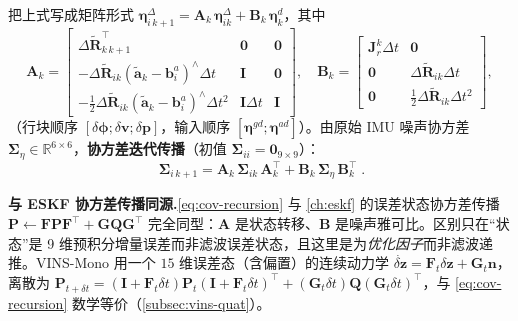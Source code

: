 把上式写成矩阵形式 $\boldsymbol\eta_{i\,k+1}^\Delta=\mathbf A_k\,\boldsymbol\eta_{ik}^\Delta+\mathbf B_k\,\boldsymbol\eta_k^d$，其中
\begin{equation}
  \mathbf A_k=\begin{bmatrix}
    \Delta\tilde{\mathbf R}_{k\,k+1}^\top & \mathbf 0 & \mathbf 0\\
    -\Delta\tilde{\mathbf R}_{ik}(\tilde{\mathbf a}_k-\mathbf b_i^a)^\wedge\Delta t & \mathbf I & \mathbf 0\\
    -\tfrac12\Delta\tilde{\mathbf R}_{ik}(\tilde{\mathbf a}_k-\mathbf b_i^a)^\wedge\Delta t^2 & \mathbf I\Delta t & \mathbf I
  \end{bmatrix},\quad
  \mathbf B_k=\begin{bmatrix}
    \mathbf J_r^k\Delta t & \mathbf 0\\
    \mathbf 0 & \Delta\tilde{\mathbf R}_{ik}\Delta t\\
    \mathbf 0 & \tfrac12\Delta\tilde{\mathbf R}_{ik}\Delta t^2
  \end{bmatrix},
  \label{eq:AB-matrices}
\end{equation}
（行块顺序 $[\delta\boldsymbol\phi;\delta\mathbf v;\delta\mathbf p]$，输入顺序 $[\boldsymbol\eta^{gd};\boldsymbol\eta^{ad}]$）。由原始 IMU 噪声协方差 $\boldsymbol\Sigma_\eta\in\mathbb R^{6\times6}$，\textbf{协方差迭代传播}（初值 $\boldsymbol\Sigma_{ii}=\mathbf 0_{9\times9}$）：
\begin{equation}
  \boxed{\;\boldsymbol\Sigma_{i\,k+1}=\mathbf A_k\,\boldsymbol\Sigma_{ik}\,\mathbf A_k^\top+\mathbf B_k\,\boldsymbol\Sigma_\eta\,\mathbf B_k^\top\;}.
  \label{eq:cov-recursion}
\end{equation}

\begin{note}
\textbf{与 ESKF 协方差传播同源.}\;\cref{eq:cov-recursion} 与 \cref{ch:eskf} 的误差状态协方差传播 $\mathbf P\leftarrow\mathbf F\mathbf P\mathbf F^\top+\mathbf G\mathbf Q\mathbf G^\top$ 完全同型：$\mathbf A$ 是状态转移、$\mathbf B$ 是噪声雅可比。区别只在“状态”是 9 维预积分增量误差而非滤波误差状态，且这里是为\emph{优化因子}而非滤波递推。VINS-Mono 用一个 $15$ 维误差态（含偏置）的连续动力学 $\dot{\delta\mathbf z}=\mathbf F_t\delta\mathbf z+\mathbf G_t\mathbf n$，离散为 $\mathbf P_{t+\delta t}=(\mathbf I+\mathbf F_t\delta t)\mathbf P_t(\mathbf I+\mathbf F_t\delta t)^\top+(\mathbf G_t\delta t)\mathbf Q(\mathbf G_t\delta t)^\top$\cite{qin2018vins}，与 \cref{eq:cov-recursion} 数学等价（\cref{subsec:vins-quat}）。
\end{note}

